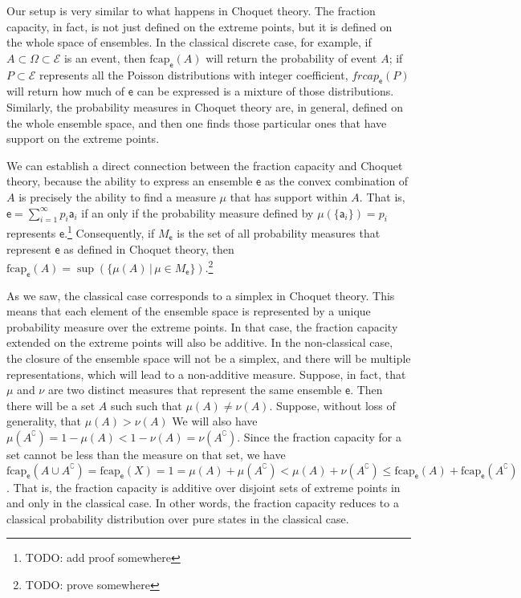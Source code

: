 \documentclass[10pt,twocolumn, nofootinbib]{revtex4-2}
\newcommand\frcap{\mathrm{fcap}}
\newcommand{\ens}[1][e] {\mathsf{#1}} %
\newcommand{\Ens}[1][E] {\mathcal{#1}} %
\begin{document}
Our setup is very similar to what happens in Choquet theory. The fraction capacity, in fact, is not just defined on the extreme points, but it is defined on the whole space of ensembles. In the classical discrete case, for example, if $A \subset \Omega \subset \Ens$ is an event, then $\frcap_{\ens}(A)$ will return the probability of event $A$; if $P \subset \Ens$ represents all the Poisson distributions with integer coefficient, $frcap_{\ens}(P)$ will return how much of $\ens$ can be expressed is a mixture of those distributions. Similarly, the probability measures in Choquet theory are, in general, defined on the whole ensemble space, and then one finds those particular ones that have support on the extreme points.

We can establish a direct connection between the fraction capacity and Choquet theory, because the ability to express an ensemble $\ens$ as the convex combination of $A$ is precisely the ability to find a measure $\mu$ that has support within $A$. That is, $\ens = \sum_{i=1}^{\infty} p_i \ens[a]_i$ if an only if the probability measure defined by $\mu(\{\ens[a]_i\}) = p_i$ represents $\ens$.\footnote{TODO: add proof somewhere} Consequently, if $M_{\ens}$ is the set of all probability measures that represent $\ens$ as defined in Choquet theory, then $\frcap_{\ens}(A) = \sup(\{\mu(A) \, | \, \mu \in M_{\ens}\})$.\footnote{TODO: prove somewhere}

As we saw, the classical case corresponds to a simplex in Choquet theory. This means that each element of the ensemble space is represented by a unique probability measure over the extreme points. In that case, the fraction capacity extended on the extreme points will also be additive. In the non-classical case, the closure of the ensemble space will not be a simplex, and there will be multiple representations, which will lead to a non-additive measure. Suppose, in fact, that $\mu$ and $\nu$ are two distinct measures that represent the same ensemble $\ens$. Then there will be a set $A$ such such that $\mu(A) \neq \nu(A)$. Suppose, without loss of generality, that $\mu(A) > \nu(A)$ We will also have $\mu(A^{\complement}) = 1- \mu(A) < 1 - \nu(A) = \nu(A^{\complement})$. Since the fraction capacity for a set cannot be less than the measure on that set, we have $\frcap_{\ens}(A \cup A^{\complement})=\frcap_{\ens}(X) = 1 = \mu(A) + \mu(A^{\complement}) < \mu(A) + \nu(A^{\complement}) \leq \frcap_{\ens}(A) + \frcap_{\ens}(A^{\complement})$. That is, the fraction capacity is additive over disjoint sets of extreme points in and only in the classical case. In other words, the fraction capacity reduces to a classical probability distribution over pure states in the classical case.
\end{document}
